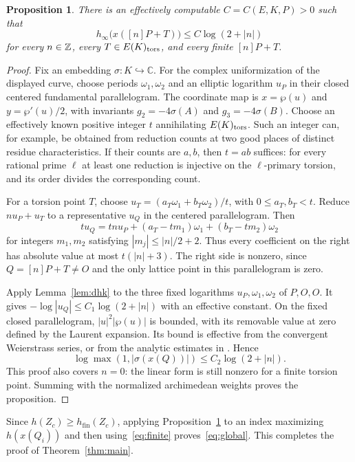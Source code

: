 \documentclass[11pt,a4paper]{article}
\newtheorem{proposition}[theorem]{Proposition}
\newcommand{\hfin}{h_{\mathrm{fin}}}
\newcommand{\hinf}{h_{\infty}}
\begin{document}
\begin{proposition}\label{prop:arch}
There is an effectively computable $C=C(E,K,P)>0$ such that
\[
 \hinf\bigl(x([n]P+T)\bigr)\le C\log(2+|n|)
\]
for every $n\in\mathbb Z$, every $T\in E(K)_{\rm tors}$, and every
finite $[n]P+T$.
\end{proposition}
\begin{proof}
Fix an embedding $\sigma:K\hookrightarrow\mathbb C$. For the
complex uniformization of the displayed curve, choose periods
$\omega_1,\omega_2$ and an elliptic logarithm $u_P$ in their
closed centered fundamental parallelogram. The coordinate map is
$x=\wp(u)$ and $y=\wp'(u)/2$, with invariants
$g_2=-4\sigma(A)$ and $g_3=-4\sigma(B)$.
Choose an effectively known positive integer $t$ annihilating
$E(K)_{\rm tors}$. Such an integer can, for example, be obtained
from reduction counts at two good places of distinct residue
characteristics. If their counts are $a,b$, then $t=ab$ suffices:
for every rational prime $\ell$ at least one reduction is injective
on the $\ell$-primary torsion, and its order divides the corresponding
count.

For a torsion point $T$, choose
$u_T=(a_T\omega_1+b_T\omega_2)/t$, with
$0\le a_T,b_T<t$. Reduce $nu_P+u_T$ to a representative $u_Q$
in the centered parallelogram. Then
\[
 t u_Q=tnu_P+(a_T-tm_1)\omega_1+(b_T-tm_2)\omega_2
\]
for integers $m_1,m_2$ satisfying
$|m_j|\le |n|/2+2$. Thus every coefficient on the right has
absolute value at most $t(|n|+3)$. The right side is nonzero,
since $Q=[n]P+T\ne O$ and the only lattice point in this
parallelogram is zero.

Apply Lemma~\ref{lem:dhk} to the three fixed logarithms
$u_P,\omega_1,\omega_2$ of $P,O,O$. It gives
$-\log|u_Q|\le C_1\log(2+|n|)$ with an effective constant.
On the fixed closed parallelogram, $|u|^2|\wp(u)|$ is bounded,
with its removable value at zero defined by the Laurent
expansion. Its bound is effective from the convergent
Weierstrass series, or from the analytic estimates in
\cite[Section 2.1]{DHK}. Hence
\[
 \log\max(1,|\sigma(x(Q))|)\le C_2\log(2+|n|).
\]
This proof also covers $n=0$: the linear form is still nonzero
for a finite torsion point. Summing with the normalized
archimedean weights proves the proposition.
\end{proof}

Since $h(Z_c)\ge\hfin(Z_c)$, applying Proposition~\ref{prop:arch}
to an index maximizing $h(x(Q_i))$ and then using~\eqref{eq:finite}
proves~\eqref{eq:global}. This completes the proof of
Theorem~\ref{thm:main}.
\end{document}
